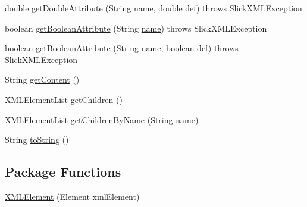 \begin{DoxyCompactItemize}
\item 
double \mbox{\hyperlink{classorg_1_1newdawn_1_1slick_1_1util_1_1xml_1_1_x_m_l_element_a8cafc860482d907877f6f5063596c29f}{get\+Double\+Attribute}} (String \mbox{\hyperlink{classorg_1_1newdawn_1_1slick_1_1util_1_1xml_1_1_x_m_l_element_aa96123a88e2614952c4d3d1a4207560a}{name}}, double def)  throws Slick\+X\+M\+L\+Exception 
\item 
boolean \mbox{\hyperlink{classorg_1_1newdawn_1_1slick_1_1util_1_1xml_1_1_x_m_l_element_a36639543c9fa4a8c5a18b46a35e817e9}{get\+Boolean\+Attribute}} (String \mbox{\hyperlink{classorg_1_1newdawn_1_1slick_1_1util_1_1xml_1_1_x_m_l_element_aa96123a88e2614952c4d3d1a4207560a}{name}})  throws Slick\+X\+M\+L\+Exception 
\item 
boolean \mbox{\hyperlink{classorg_1_1newdawn_1_1slick_1_1util_1_1xml_1_1_x_m_l_element_adc7a26e07efa028c69d4cd1e5d1da019}{get\+Boolean\+Attribute}} (String \mbox{\hyperlink{classorg_1_1newdawn_1_1slick_1_1util_1_1xml_1_1_x_m_l_element_aa96123a88e2614952c4d3d1a4207560a}{name}}, boolean def)  throws Slick\+X\+M\+L\+Exception 
\item 
String \mbox{\hyperlink{classorg_1_1newdawn_1_1slick_1_1util_1_1xml_1_1_x_m_l_element_a829a40f981d9515197f6c0935297c43f}{get\+Content}} ()
\item 
\mbox{\hyperlink{classorg_1_1newdawn_1_1slick_1_1util_1_1xml_1_1_x_m_l_element_list}{X\+M\+L\+Element\+List}} \mbox{\hyperlink{classorg_1_1newdawn_1_1slick_1_1util_1_1xml_1_1_x_m_l_element_a10c6979b50971669482bb8e541e7d9f0}{get\+Children}} ()
\item 
\mbox{\hyperlink{classorg_1_1newdawn_1_1slick_1_1util_1_1xml_1_1_x_m_l_element_list}{X\+M\+L\+Element\+List}} \mbox{\hyperlink{classorg_1_1newdawn_1_1slick_1_1util_1_1xml_1_1_x_m_l_element_ab88e2a14f1ad6b190199f76fdad17aa4}{get\+Children\+By\+Name}} (String \mbox{\hyperlink{classorg_1_1newdawn_1_1slick_1_1util_1_1xml_1_1_x_m_l_element_aa96123a88e2614952c4d3d1a4207560a}{name}})
\item 
String \mbox{\hyperlink{classorg_1_1newdawn_1_1slick_1_1util_1_1xml_1_1_x_m_l_element_aa28c517a2c08f9c84057cf32fd864ed8}{to\+String}} ()
\end{DoxyCompactItemize}
\subsection*{Package Functions}
\begin{DoxyCompactItemize}
\item 
\mbox{\hyperlink{classorg_1_1newdawn_1_1slick_1_1util_1_1xml_1_1_x_m_l_element_a5ccfa3d37df452a4f5680176e272f283}{X\+M\+L\+Element}} (Element xml\+Element)
\end{DoxyCompactItemize}

